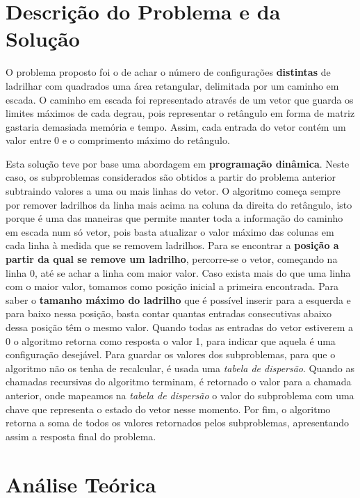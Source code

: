 \documentclass[12pt,a4paper]{article}
\begin{document}
  \section{Descrição do Problema e da Solução}

  O problema proposto foi o de achar o número de configurações \textbf{distintas} de ladrilhar com quadrados uma área retangular, delimitada por um caminho em escada.
  O caminho em escada foi representado através de um vetor que guarda os limites máximos de cada degrau, pois representar o retângulo em forma de matriz gastaria demasiada memória e tempo.
  Assim, cada entrada do vetor contém um valor entre 0 e o comprimento máximo do retângulo.

  Esta solução teve por base uma abordagem em \textbf{programação dinâmica}.
  Neste caso, os subproblemas considerados são obtidos a partir do problema anterior subtraindo valores a uma ou mais linhas do vetor.
  O algoritmo começa sempre por remover ladrilhos da linha mais acima na coluna da direita do retângulo, isto porque é uma das maneiras que permite manter toda a informação do caminho em escada num só vetor, pois basta atualizar o valor máximo das colunas em cada linha à medida que se removem ladrilhos.
  Para se encontrar a \textbf{posição a partir da qual se remove um ladrilho}, percorre-se o vetor, começando na linha 0, até se achar a linha com maior valor.
  Caso exista mais do que uma linha com o maior valor, tomamos como posição inicial a primeira encontrada.
  Para saber o \textbf{tamanho máximo do ladrilho} que é possível inserir para a esquerda e para baixo nessa posição, basta contar quantas entradas consecutivas abaixo dessa posição têm o mesmo valor.
  Quando todas as entradas do vetor estiverem a 0 o algoritmo retorna como resposta o valor 1, para indicar que aquela é uma configuração desejável.
  Para guardar os valores dos subproblemas, para que o algoritmo não os tenha de recalcular, é usada uma \textit{tabela de dispersão}.
  Quando as chamadas recursivas do algoritmo terminam, é retornado o valor para a chamada anterior, onde mapeamos na \textit{tabela de dispersão} o valor do subproblema com uma chave que representa o estado do vetor nesse momento.
  Por fim, o algoritmo retorna a soma de todos os valores retornados pelos subproblemas, apresentando assim a resposta final do problema.

  \section{Análise Teórica}
\end{document}
